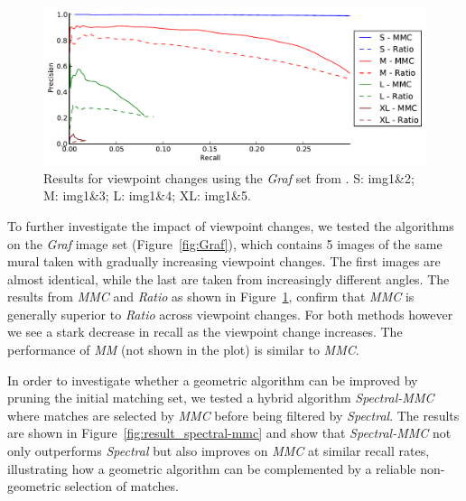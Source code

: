 \begin{figure}[htb]
	\centering
	\includegraphics[width=1\textwidth]{images/result_viewpoint}
	\caption{Results for viewpoint changes using the \emph{Graf} set 
	from \cite{mikolajczyk2005performance}.  S: img1\&2; M: img1\&3; L: 
	img1\&4; XL: img1\&5.}
	\label{fig:result_viewpoint}
\end{figure}

To further investigate the impact of viewpoint changes, we tested the 
algorithms on the \emph{Graf} image set (Figure~\ref{fig:Graf}), which 
contains 5 images of the same mural taken with gradually increasing 
viewpoint changes.  The first images are almost identical, while the 
last are taken from increasingly different angles. The results from   
\emph{MMC} and \emph{Ratio} as shown in 
Figure~\ref{fig:result_viewpoint}, confirm that \emph{MMC} is generally 
superior to \emph{Ratio} across viewpoint changes. For both methods 
however we see a stark decrease in recall as the viewpoint change 
increases. The performance of \emph{MM} (not shown in the plot) is 
similar to \emph{MMC}.


In order to investigate whether a geometric algorithm can be improved by
pruning the initial matching set, we tested a hybrid algorithm 
\emph{Spectral-MMC} where matches are selected by \emph{MMC} before 
being filtered by \emph{Spectral}. The results are shown in 
Figure~\ref{fig:result_spectral-mmc} and show that \emph{Spectral-MMC} 
not only outperforms \emph{Spectral} but also improves on \emph{MMC} at 
similar recall rates, illustrating how a geometric algorithm can be 
complemented by a reliable non-geometric selection of matches.


